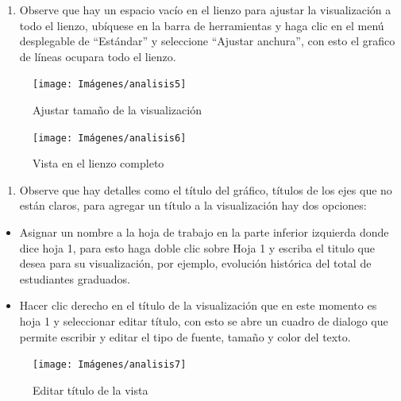 \documentclass[
]{book}
\providecommand{\tightlist}{%
  \setlength{\itemsep}{0pt}\setlength{\parskip}{0pt}}
\begin{document}
\begin{enumerate}
\def\labelenumi{\arabic{enumi}.}
\setcounter{enumi}{3}
\tightlist
\item
  Observe que hay un espacio vacío en el lienzo para ajustar la visualización a todo el lienzo, ubíquese en la barra de herramientas y haga clic en el menú desplegable de ``Estándar'' y seleccione ``Ajustar anchura'', con esto el grafico de líneas ocupara todo el lienzo.
\end{enumerate}

\begin{figure}

{\centering \texttt{[image: Imágenes/analisis5]} 

}

\caption{Ajustar tamaño de la visualización}\label{fig:paso4lineas-fig}
\end{figure}
\begin{figure}

{\centering \texttt{[image: Imágenes/analisis6]} 

}

\caption{Vista en el lienzo completo}\label{fig:paso4-1lineas-fig}
\end{figure}

\begin{enumerate}
\def\labelenumi{\arabic{enumi}.}
\setcounter{enumi}{4}
\tightlist
\item
  Observe que hay detalles como el título del gráfico, títulos de los ejes que no están claros, para agregar un título a la visualización hay dos opciones:
\end{enumerate}

\begin{itemize}
\item
  Asignar un nombre a la hoja de trabajo en la parte inferior izquierda donde dice hoja 1, para esto haga doble clic sobre Hoja 1 y escriba el titulo que desea para su visualización, por ejemplo, evolución histórica del total de estudiantes graduados.
\item
  Hacer clic derecho en el título de la visualización que en este momento es hoja 1 y seleccionar editar título, con esto se abre un cuadro de dialogo que permite escribir y editar el tipo de fuente, tamaño y color del texto.
\end{itemize}

\begin{figure}

{\centering \texttt{[image: Imágenes/analisis7]} 

}

\caption{Editar título de la vista}\label{fig:paso5-11lineas-fig}
\end{figure}
\end{document}
